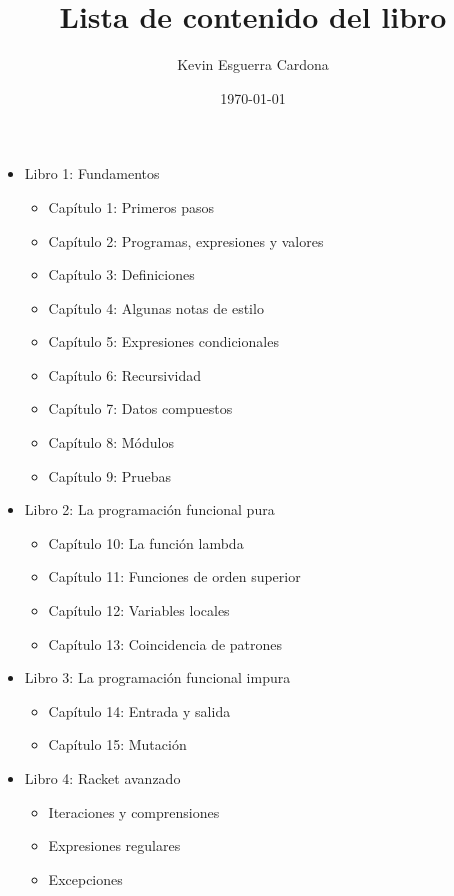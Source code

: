 \documentclass[12pt, letterpaper]{article}
\title{Lista de contenido del libro}
\author{Kevin Esguerra Cardona}
\date{\today}
\begin{document}
    
\maketitle

\begin{itemize}
    \item Libro 1: Fundamentos
    \begin{itemize}
        \item Capítulo 1: Primeros pasos
        \item Capítulo 2: Programas, expresiones y valores
        \item Capítulo 3: Definiciones
        \item Capítulo 4: Algunas notas de estilo
        \item Capítulo 5: Expresiones condicionales
        \item Capítulo 6: Recursividad
        \item Capítulo 7: Datos compuestos
        \item Capítulo 8: Módulos
        \item Capítulo 9: Pruebas
    \end{itemize}
    \item Libro 2: La programación funcional pura
    \begin{itemize}
        \item Capítulo 10: La función lambda
        \item Capítulo 11: Funciones de orden superior
        \item Capítulo 12: Variables locales
        \item Capítulo 13: Coincidencia de patrones
    \end{itemize}
    \item Libro 3: La programación funcional impura
    \begin{itemize}
        \item Capítulo 14: Entrada y salida
        \item Capítulo 15: Mutación
    \end{itemize}
    \newpage
    \item Libro 4: Racket avanzado
    \begin{itemize}
        \item Iteraciones y comprensiones
        \item Expresiones regulares
        \item Excepciones
    \end{itemize}
\end{itemize}
\end{document}
